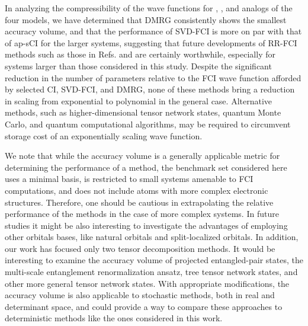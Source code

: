 \documentclass[aip,jcp,amsmath,amssymb, reprint]{revtex4-1}
\begin{document}
In analyzing the compressibility of the wave functions for , , and  analogs of the four  models, we have determined that DMRG consistently shows the smallest accuracy volume, and that the performance of SVD-FCI is more on par with that of ap-sCI for the larger systems, suggesting that future developments of RR-FCI methods such as those in Refs.  and  are certainly worthwhile, especially for systems larger than those considered in this study. 
Despite the significant reduction in the number of parameters relative to the FCI wave function afforded by selected CI, SVD-FCI, and DMRG, none of these methods bring a reduction in scaling from exponential to polynomial in the general case.
Alternative methods, such as higher-dimensional tensor network states, quantum Monte Carlo, and quantum computational algorithms, may be required to circumvent storage cost of an exponentially scaling wave function.

We note that while the accuracy volume is a generally applicable metric for determining the performance of a method, the benchmark set considered here uses a minimal basis, is restricted to small systems amenable to FCI computations, and does not include atoms with more complex electronic structures.
Therefore, one should be cautious in extrapolating the relative performance of the methods in the case of more complex systems.
In future studies it might be also interesting to investigate the advantages of employing other orbitals bases, like natural orbitals and split-localized orbitals.
In addition, our work has focused only two tensor decomposition methods.
It would be interesting to examine the accuracy volume of projected entangled-pair states,\cite{verstraete2004renormalization} the multi-scale entanglement renormalization ansatz,\cite{vidal2007entanglement} tree tensor network states,\cite{Murg2010SimulatingStrongly, Nakatani2013EfficientTree, murg2015tree} and other more general tensor network states.
With appropriate modifications, the accuracy volume is also applicable to stochastic methods,\cite{needs2009continuum, motta2018ab} both in real and determinant space, and could provide a way to compare these approaches to deterministic methods like the ones considered in this work.
\end{document}
